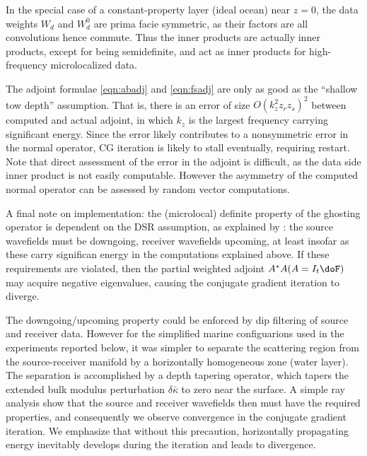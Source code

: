 In the special case of a constant-property layer (ideal ocean) near
$z=0$, the data weights $W_d$ and $W_d^0$ are prima facie symmetric, as their
factors are all convolutions hence commute. Thus the inner products
are actually inner products, except for being semidefinite, and act as
inner products for high-frequency microlocalized data.

The adjoint formulae \ref{eqn:abadj} and \ref{eqn:fsadj} are only as
good as the ``shallow tow depth'' assumption. That is, there is an
error of size $O(k_z^2z_rz_s)^2$ between computed and actual adjoint,
in which $k_z$ is the largest frequency carrying significant
energy. Since the error likely contributes to a nonsymmetric error in
the normal operator, CG iteration is likely to stall eventually,
requiring restart. Note that direct assessment of the error in the
adjoint is difficult, as the data side inner product is not easily
computable. However the asymmetry of the computed normal operator can
be assessed by random vector computations.

A final note on implementation: the (microlocal) definite property of
the ghosting operator is dependent on the DSR assumption, as explained
by \cite{HouSymes:15}: the source wavefields must be downgoing,
receiver wavefields upcoming, at least insofar as these carry
significan energy in the computations explained above. If these
requirements are violated, then the partial weighted adjoint $A^*A
(A=I_t \doF)$ may acquire negative eigenvalues, causing the conjugate
gradient iteration to diverge. 

The downgoing/upcoming property
could be enforced by dip filtering of source and receiver
data. However for the simplified marine configuarions used in the
experiments reported below, it was simpler to separate the scattering
region from the source-receiver manifold by a horizontally homogeneous
zone (water layer).  The separation is accomplished by a depth
tapering operator, which tapers the extended bulk modulus perturbation
$\delta \bar{\kappa}$ to zero near the surface. A simple ray analysis
show that the source and receiver wavefields then must have the
required properties, and consequently we observe convergence in the
conjugate gradient iteration. We emphasize that without this
precaution, horizontally propagating energy inevitably develops during
the iteration and leads to divergence.





